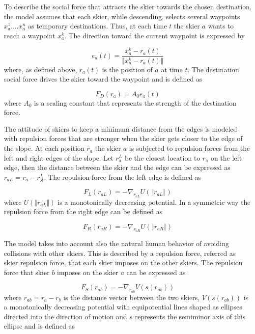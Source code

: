 \documentclass[12pt,a4paper,twoside]{book}
\begin{document}
To describe the social force that attracts the skier towards the chosen destination, the model assumes that each skier, while descending, selects several waypoints $x_a^1....x_a^n$ as temporary destinations. Thus, at each time $t$ the skier $a$ wants to reach a waypoint $x_a^k$. The direction toward the current waypoint is expressed by

\begin{equation}\label{waypoint_direction}
e_a(t)=\frac{x^k_a-r_a(t)}{\Vert x^k_a-r_a(t) \Vert}
\end{equation}
where, as defined above, $r_a(t)$ is the position of $a$ at time $t$. The destination social force drives the skier toward the waypoint and is defined as

\begin{equation}\label{destination_force}
F_D(r_a)=A_0 e_a(t)
\end{equation}
where $A_0$ is a scaling constant that represents the strength of the destination force.

The attitude of skiers to keep a minimum distance from the edges is modeled with repulsion forces that are stronger when the skier gets closer to the edge of the slope. At each position $r_a$ the skier $a$ is subjected to repulsion forces from the left and right edges of the slope. Let $r_a^L$ be the closest location to $r_a$ on the left edge, then the distance between the skier and the edge can be expressed as $r_{aL}=r_a-r_A^L$. The repulsion force from the left edge is defined as

\begin{equation}\label{left_force}
F_L(r_{aL})=-\nabla_{r_{aL}}U(\Vert r_{aL} \Vert )
\end{equation}
where $U(\Vert r_{aL} \Vert )$ is a monotonically decreasing potential. In a symmetric way the repulsion force from the right edge can be defined as

\begin{equation}\label{right_force}
F_R(r_{aR})=-\nabla_{r_{aR}}U(\Vert r_{aR} \Vert )
\end{equation}

The model takes into account also the natural human behavior of avoiding collisions with other skiers. This is described by a repulsion force, referred as skier repulsion force, that each skier imposes on the other skiers. The repulsion force that skier $b$ imposes on the skier $a$ can be expressed as

\begin{equation}\label{skier_force}
F_S(r_{ab})=-\nabla_{r_{ab}}V(s(r_{ab}))
\end{equation}
where $r_{ab}=r_a-r_b$ is the distance vector between the two skiers, $V(s(r_{ab}))$ is a monotonically decreasing potential with equipotential lines shaped as ellipses directed into the direction of motion and $s$ represents the semiminor axis of this ellipse and is defined as
\end{document}

